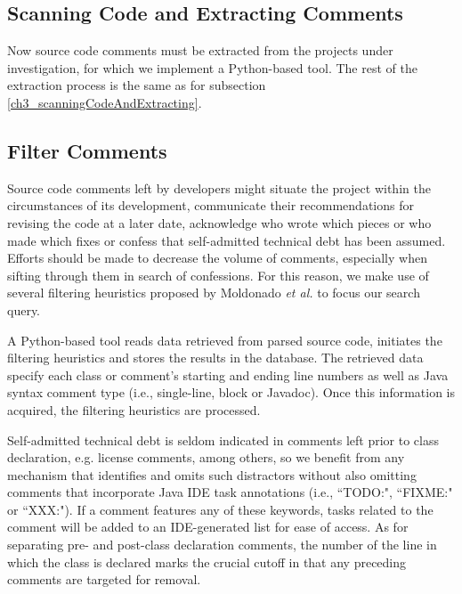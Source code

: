 \subsection{Scanning Code and Extracting Comments}

Now source code comments must be extracted from the projects under investigation, for which we implement a Python-based tool. The rest of the extraction process is the same as for subsection \ref{ch3_scanningCodeAndExtracting}. 


\subsection{Filter Comments}


Source code comments left by developers might situate the project within the circumstances of its development, communicate their recommendations for revising the code at a later date, acknowledge who wrote which pieces or who made which fixes or confess that self-admitted technical debt has been assumed. Efforts should be made to decrease the volume of comments, especially when sifting through them in search of \SATD confessions. For this reason, we make use of several filtering heuristics proposed by Moldonado \textit{et al.} \cite{Maldonado_TSE2017} to focus our search query.\par

A Python-based tool reads data retrieved from parsed source code, initiates the filtering heuristics and stores the results in the database. The retrieved data specify each class or comment's starting and ending line numbers as well as Java syntax comment type (i.e., single-line, block or Javadoc). Once this information is acquired, the filtering heuristics are processed. \par

Self-admitted technical debt is seldom indicated in comments left prior to class declaration, e.g. license comments, among others, so we benefit from any mechanism that identifies and omits such distractors without also omitting comments that incorporate Java IDE task annotations (i.e., ``TODO:", ``FIXME:" or ``XXX:"). If a comment features any of these keywords, tasks related to the comment will be added to an IDE-generated list for ease of access. As for separating pre- and post-class declaration comments, the number of the line in which the class is declared marks the crucial cutoff in that any preceding comments are targeted for removal.\par

